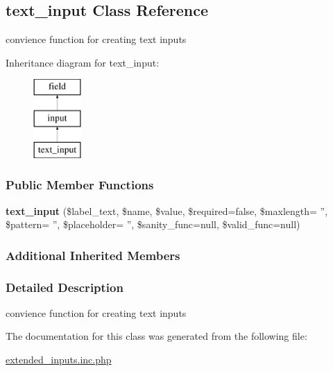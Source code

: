 \hypertarget{classtext__input}{\subsection{text\-\_\-input Class Reference}
\label{classtext__input}
}


convience function for creating text inputs  


Inheritance diagram for text\-\_\-input\-:\begin{figure}[H]
\begin{center}
\leavevmode
\includegraphics[height=3.000000cm]{classtext__input}
\end{center}
\end{figure}
\subsubsection*{Public Member Functions}
\begin{DoxyCompactItemize}
\item 
\hypertarget{classtext__input_aca9f9a2b1c7c800362d45eb9a27e97de}{{\bfseries text\-\_\-input} (\$label\-\_\-text, \$name, \$value, \$required=false, \$maxlength= '', \$pattern= '', \$placeholder= '', \$sanity\-\_\-func=null, \$valid\-\_\-func=null)}\label{classtext__input_aca9f9a2b1c7c800362d45eb9a27e97de}

\end{DoxyCompactItemize}
\subsubsection*{Additional Inherited Members}


\subsubsection{Detailed Description}
convience function for creating text inputs 



The documentation for this class was generated from the following file\-:\begin{DoxyCompactItemize}
\item 
\hyperlink{extended__inputs_8inc_8php}{extended\-\_\-inputs.\-inc.\-php}\end{DoxyCompactItemize}
